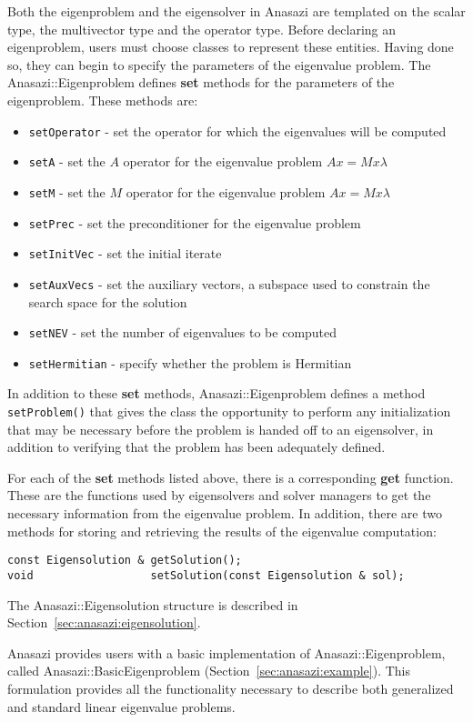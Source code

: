 Both the eigenproblem and the eigensolver in Anasazi are templated 
on the scalar type, the multivector type and the operator type. Before
declaring an eigenproblem, users must choose classes to represent these
entities. Having done so, they can begin to specify the parameters of the
eigenvalue problem. The Anasazi::Eigenproblem defines \textbf{set} methods for
the parameters of the eigenproblem. These methods are:
\begin{itemize}
\item \verb!setOperator! - set the operator for which the eigenvalues will be computed
\item \verb!setA! - set the $A$ operator for the eigenvalue problem $A x = M x \lambda$
\item \verb!setM! - set the $M$ operator for the eigenvalue problem $A x = M x \lambda$
\item \verb!setPrec! - set the preconditioner for the eigenvalue problem
\item \verb!setInitVec! - set the initial iterate
\item \verb!setAuxVecs! - set the auxiliary vectors, a subspace used to constrain the
  search space for the solution
\item \verb!setNEV! - set the number of eigenvalues to be computed
\item \verb!setHermitian! - specify whether the problem is Hermitian
\end{itemize}
In addition to these \textbf{set} methods, Anasazi::Eigenproblem defines
a method \verb!setProblem()! that gives the class the opportunity to perform
any initialization that may be necessary before the problem is handed off to an
eigensolver, in addition to verifying that the problem has been adequately defined. 

For each of the \textbf{set} methods listed above, there is a corresponding
\textbf{get} function. These are the functions used by eigensolvers and solver managers to get
the necessary information from the eigenvalue problem. In addition, there are
two methods for storing and retrieving the results of the eigenvalue computation:
\begin{verbatim}
const Eigensolution & getSolution();
void                  setSolution(const Eigensolution & sol);
\end{verbatim}
The Anasazi::Eigensolution structure is described in
Section~\ref{sec:anasazi:eigensolution}.

Anasazi provides users with a basic implementation of
Anasazi::Eigenproblem, called Anasazi::BasicEigenproblem
(Section~\ref{sec:anasazi:example}).
This formulation provides all the functionality
necessary to describe both generalized and standard linear eigenvalue problems.



